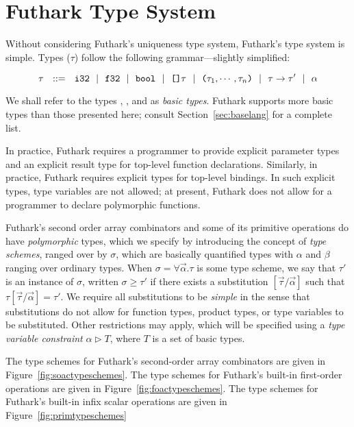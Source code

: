 \documentclass[11pt]{book}
\begin{document}
\section{Futhark Type System}
Without considering Futhark's uniqueness type system, Futhark's type system is simple. Types ($\tau$) follow the following grammar---slightly simplified:

$$\tau ~~::=~~ \texttt{i32} ~~|~~ \texttt{f32} ~~|~~ \texttt{bool} ~~|~~ \texttt{[]}\tau ~~|~~ \texttt{(}\tau_1,\cdots,\tau_n\texttt{)} ~~|~~ \tau \rightarrow \tau' ~~|~~ \alpha$$

\noindent We shall refer to the types , , and  as
\emph{basic types}. Futhark supports more basic types than those
presented here; consult Section~\ref{sec:baselang} for a complete list.

In practice, Futhark requires a programmer to provide explicit
parameter types and an explicit result type for top-level function
declarations. Similarly, in practice, Futhark requires explicit types
for top-level  bindings. In such explicit types, type
variables are not allowed; at present, Futhark does not allow for a
programmer to declare polymorphic functions.

Futhark's second order array combinators and some of its primitive
operations do have \emph{polymorphic} types, which we specify by
introducing the concept of \emph{type schemes}, ranged over by $\sigma$,
which are basically quantified types with $\alpha$ and $\beta$ ranging
over ordinary types. When $\sigma=\forall\vec{\alpha}.\tau$ is some
type scheme, we say that $\tau'$ is an instance of $\sigma$, written
$\sigma \geq \tau'$ if there exists a substitution
$[\vec{\tau}/\vec{\alpha}]$ such that $\tau[\vec{\tau}/\vec{\alpha}] =
\tau'$. We require all substitutions to be \emph{simple} in the sense
that substitutions do not allow for function types, product types, or
type variables to be substituted. Other restrictions may apply, which
will be specified using a \emph{type variable constraint} $\alpha
\triangleright T$, where $T$ is a set of basic types.

The type schemes for Futhark's second-order array combinators are
given in Figure~\ref{fig:soactypeschemes}. The type schemes for
Futhark's built-in first-order operations are given in
Figure~\ref{fig:foactypeschemes}. The type schemes for Futhark's
built-in infix scalar operations are given in
Figure~\ref{fig:primtypeschemes}
\end{document}
